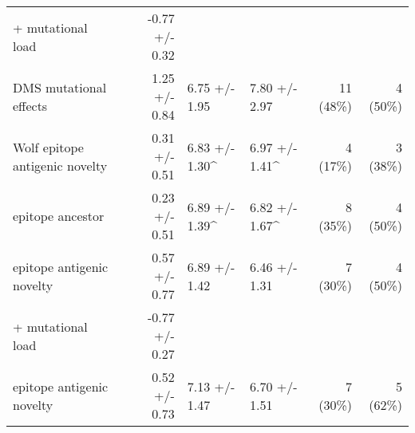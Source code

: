 \begin{tabular*}{1.15\textwidth}{lrllrr}
\hspace{5mm} + mutational load & -0.77 +/- 0.32 & & & & \\
DMS mutational effects & 1.25 +/- 0.84 & 6.75 +/- 1.95 & 7.80 +/- 2.97 & 11 (48\%) & 4 (50\%) \\
Wolf epitope antigenic novelty & 0.31 +/- 0.51 & 6.83 +/- 1.30\^ & 6.97 +/- 1.41\^ & 4 (17\%) & 3 (38\%) \\
epitope ancestor & 0.23 +/- 0.51 & 6.89 +/- 1.39\^ & 6.82 +/- 1.67\^ & 8 (35\%) & 4 (50\%) \\
epitope antigenic novelty & 0.57 +/- 0.77 & 6.89 +/- 1.42 & 6.46 +/- 1.31 & 7 (30\%) & 4 (50\%) \\
\hspace{5mm} + mutational load & -0.77 +/- 0.27 & & & & \\
epitope antigenic novelty & 0.52 +/- 0.73 & 7.13 +/- 1.47 & 6.70 +/- 1.51 & 7 (30\%) & 5 (62\%) \\

\bottomrule
\end{tabular*}
